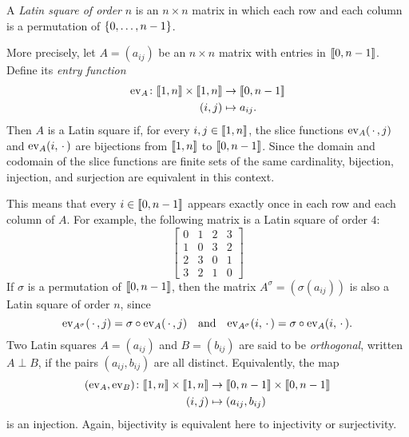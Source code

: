 \begin{xmpl}{}
    A \textsl{Latin square of order} $n$ is an $n\times n$ matrix in which each row and each column is a permutation of $\set{0,\dots,n-1}$.
    
    More precisely, let $A = (a_{ij})$ be an $n \times n$ matrix with entries in $\nset[0]{n-1}$. Define its \textsl{entry function}
    \begin{align*}
        \ev A\colon\nset n\times\nset n&\to\nset[0]{n-1}\\
        (i,j)&\mapsto a_{ij}.
    \end{align*}
    Then $A$ is a Latin square if, for every $i,j\in\nset n$, the slice functions $\ev A(\,\cdot\,,j)$ and $\ev A(i,\,\cdot\,)$ are bijections from $\nset n$ to $\nset[0]{n-1}$. Since the domain and codomain of the slice functions are finite sets of the same cardinality, bijection, injection, and surjection are equivalent in this context.
    
    This means that every $i\in\nset[0]{n-1}$ appears exactly once in each row and each column of $A$. For example, the following matrix is a Latin square of order $4$:
    \[
        \begin{bmatrix}
        0 & 1 & 2 & 3 \\
        1 & 0 & 3 & 2 \\
        2 & 3 & 0 & 1 \\
        3 & 2 & 1 & 0
    \end{bmatrix}
    \]
    If $\sigma$ is a permutation of $\nset[0]{n-1}$, then the matrix $A^\sigma = (\sigma(a_{ij}))$ is also a Latin square of order $n$, since
    \[
        \ev{A^\sigma}(\,\cdot\,,j) = \sigma \circ \ev A(\,\cdot\,,j)
        \quad\text{and}\quad
        \ev{A^\sigma}(i,\,\cdot\,) = \sigma \circ \ev A(i,\,\cdot\,).
    \]
    Two Latin squares $A = (a_{ij})$ and $B = (b_{ij})$ are said to be \textsl{orthogonal}, written $A \perp B$, if the pairs $(a_{ij}, b_{ij})$ are all distinct. Equivalently, the map
    \begin{align*}
        (\ev A,\ev B)\colon\nset n\times\nset n
            &\to\nset[0]{n-1}\times\nset[0]{n-1}\\
            (i,j)&\mapsto(a_{ij}, b_{ij})
    \end{align*}
    is an injection. Again, bijectivity is equivalent here to injectivity or surjectivity.
    

\end{xmpl}
